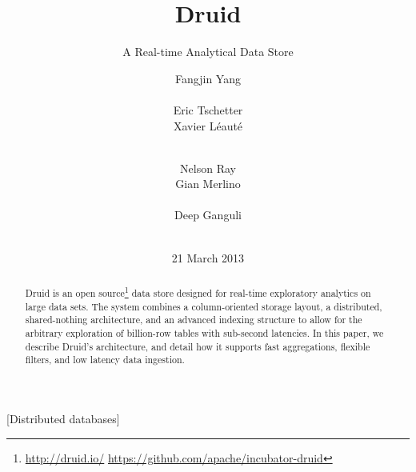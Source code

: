 \documentclass{sig-alternate-2013}
\begin{document}

\title{Druid}
\subtitle{A Real-time Analytical Data Store}


\author{
\alignauthor Fangjin Yang\\
  \\
\alignauthor Eric Tschetter\\
\alignauthor Xavier Léauté\\
  \\
\and
\alignauthor Nelson Ray\\
\alignauthor Gian Merlino\\
  \\
\alignauthor Deep Ganguli\\
  \\
}
\date{21 March 2013}


\maketitle

\begin{abstract}
Druid is an open source\footnote{\href{http://druid.io/}{http://druid.io/} \href{https://github.com/apache/incubator-druid}{https://github.com/apache/incubator-druid}}
data store designed for real-time exploratory analytics on large data sets.
The system combines a column-oriented storage layout, a distributed,
shared-nothing architecture, and an advanced indexing structure to allow for
the arbitrary exploration of billion-row tables with sub-second latencies. In
this paper, we describe Druid's architecture, and detail how it supports fast
aggregations, flexible filters, and low latency data ingestion.
\end{abstract}

[Distributed databases]
\end{document}
